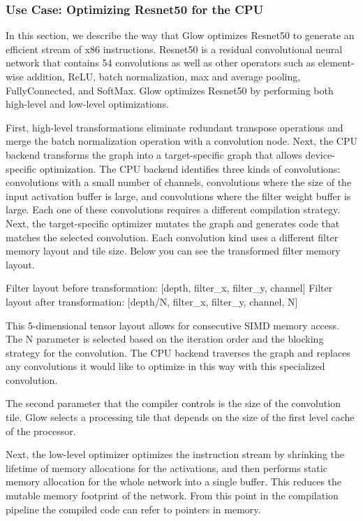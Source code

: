 \subsubsection*{Use Case\+: Optimizing Resnet50 for the C\+PU}

In this section, we describe the way that Glow optimizes Resnet50 to generate an efficient stream of x86 instructions. Resnet50 is a residual convolutional neural network that contains 54 convolutions as well as other operators such as element-\/wise addition, Re\+LU, batch normalization, max and average pooling, Fully\+Connected, and Soft\+Max. Glow optimizes Resnet50 by performing both high-\/level and low-\/level optimizations.

First, high-\/level transformations eliminate redundant transpose operations and merge the batch normalization operation with a convolution node. Next, the C\+PU backend transforms the graph into a target-\/specific graph that allows device-\/specific optimization. The C\+PU backend identifies three kinds of convolutions\+: convolutions with a small number of channels, convolutions where the size of the input activation buffer is large, and convolutions where the filter weight buffer is large. Each one of these convolutions requires a different compilation strategy. Next, the target-\/specific optimizer mutates the graph and generates code that matches the selected convolution. Each convolution kind uses a different filter memory layout and tile size. Below you can see the transformed filter memory layout.


\begin{DoxyCode}
Filter layout before transformation:
   [depth, filter\_x, filter\_y, channel]
Filter layout after transformation:
   [depth/N, filter\_x, filter\_y, channel, N]
\end{DoxyCode}


This 5-\/dimensional tensor layout allows for consecutive S\+I\+MD memory access. The N parameter is selected based on the iteration order and the blocking strategy for the convolution. The C\+PU backend traverses the graph and replaces any convolutions it would like to optimize in this way with this specialized convolution.

The second parameter that the compiler controls is the size of the convolution tile. Glow selects a processing tile that depends on the size of the first level cache of the processor.

Next, the low-\/level optimizer optimizes the instruction stream by shrinking the lifetime of memory allocations for the activations, and then performs static memory allocation for the whole network into a single buffer. This reduces the mutable memory footprint of the network. From this point in the compilation pipeline the compiled code can refer to pointers in memory.

